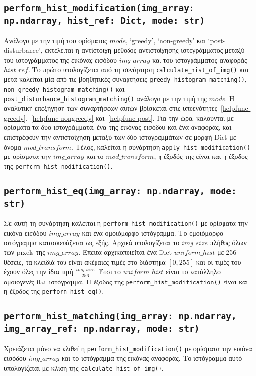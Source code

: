 \documentclass{article}
\begin{document}
\subsection{\texttt{perform\_hist\_modification(img\_array: np.ndarray, hist\_ref: Dict, mode: str)}}
Ανάλογα με την τιμή του ορίσματος $mode$, `greedy', `non-greedy' και
`post-disturbance', εκτελείται η αντίστοιχη μέθοδος αντιστοίχησης ιστογράμματος
μεταξύ του ιστογράμματος της εικόνας εισόδου $img\_array$ και του ιστο\-γράμματος
αναφοράς $hist\_ref$. Το πρώτο υπολογίζεται 
από τη συνάρτηση \verb|calculate_hist_of_img()| και μετά
καλείται μία από τις βοηθητικές συναρτήσεις \verb|greedy_histogram_matching()|, 
\verb|non_greedy_histogram_|\-\verb|matching()| και 
\verb|post_disturbance_histogram_matching()| ανάλογα με την τιμή της 
$mode$. Η αναλυτική επεξήγηση των συναρτήσεων αυτών βρίσκεται στις 
υποενότητες~\ref{helpfunc-greedy},~\ref{helpfunc-nongreedy} και~\ref{helpfunc-post}.
Για την ώρα, καλούνται με ορίσματα τα δύο ιστογράμματα, ένα της εικόνας εισόδου και ένα
αναφοράς, και επιστρέφουν την αντιστοίχηση μεταξύ των δύο ιστογραμμάτων σε 
μορφή Dict με όνομα $mod\_transform$. Τέλος, 
καλείται η συνάρτηση \verb|apply|\-\verb|_hist_modification()| με ορίσματα την $img\_array$
και το $mod\_transform$, η έξοδός της είναι και η έξοδος της 
\verb|perform_hist_modification()|.

\subsection{\texttt{perform\_hist\_eq(img\_array: np.ndarray, mode: str)}}
Σε αυτή τη συνάρτηση καλείται η \verb|perform_hist_modification()| με ορίσματα 
την εικόνα εισόδου $img\_array$ και ένα ομοιόμορφο ιστόγραμμα. Το ομοιόμορφο 
ιστόγραμμα κατασκευάζεται ως εξής. Αρχικά υπολογίζεται το $img\_size$ πλήθος όλων των pixels 
της $img\_array$. Έπειτα αρχικοποιείται ένα Dict $uniform\_hist$ με 256
θέσεις, τα κλειδιά του είναι ακέραιες τιμές στο διάστημα $\left[0, 255\right]$ και
οι τιμές του έχουν όλες την ίδια τιμή $\frac{img\_size}{256}$. Έτσι το 
$uniform\_hist$ είναι το κατάλληλο ομοιογενές flat ιστόγραμμα. Η έξοδος της 
\verb|perform_hist_modification()| είναι και η έξοδος της \verb|perform_hist_eq()|.

\subsection{\texttt{perform\_hist\_matching(img\_array: np.ndarray, img\_array\_ref: np.ndarray, mode: str)}}
Χρειάζεται μόνο να κλιθεί η \verb|perform_hist_modification()| με ορίσματα την 
εικόνα εισόδου $img\_array$ και το ιστόγραμμα της εικόνας αναφοράς. Το ιστόγραμμα
αυτό υπολογίζεται με κλίση της \verb|calculate_hist_of_img()|.
\end{document}
